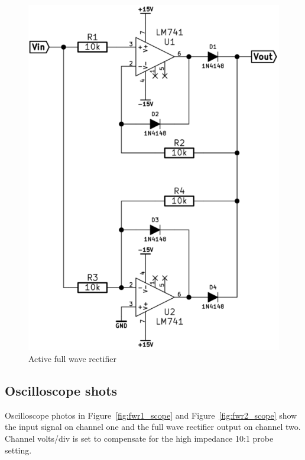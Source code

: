 \documentclass[11pt,a4paper]{article}
\begin{document}
\begin{figure}[htbp]
    \centering
    \includegraphics[scale=0.5]{img/fwr.png}
    \caption{Active full wave rectifier}
    \label{fig:fwr-schem}
\end{figure}


\subsection{Oscilloscope shots}\label{fwr-oscilloscope-shots}
Oscilloscope photos in Figure~\ref{fig:fwr1_scope} and
Figure~\ref{fig:fwr2_scope} show the input signal on channel one and the full
wave rectifier output on channel two.  Channel volts/div is set to compensate
for the high impedance 10:1 probe setting. 
\end{document}
